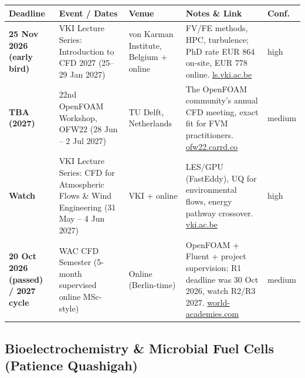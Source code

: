 \documentclass[11pt,a4paper]{article}
\begin{document}
\begin{longtable}{@{}p{3.2cm}p{3.0cm}p{2.5cm}p{5.2cm}p{1.6cm}@{}}
\toprule
\textbf{Deadline} & \textbf{Event / Dates} & \textbf{Venue} & \textbf{Notes \& Link} & \textbf{Conf.} \\
\midrule
\endhead
\textbf{25 Nov 2026 (early bird)} & VKI Lecture Series: Introduction to CFD 2027 (25--29 Jan 2027) & von Karman Institute, Belgium + online & FV/FE methods, HPC, turbulence; PhD rate EUR 864 on-site, EUR 778 online. \href{https://ls.vki.ac.be/store/lsdetails/229/introduction-to-computational-fluid-dynamics-2027}{ls.vki.ac.be} & high \\
\midrule
\textbf{TBA (2027)} & 22nd OpenFOAM Workshop, OFW22 (28 Jun -- 2 Jul 2027) & TU Delft, Netherlands & The OpenFOAM community's annual CFD meeting, exact fit for FVM practitioners. \href{https://ofw22.carrd.co/}{ofw22.carrd.co} & medium \\
\midrule
\textbf{Watch} & VKI Lecture Series: CFD for Atmospheric Flows \& Wind Engineering (31 May -- 4 Jun 2027) & VKI + online & LES/GPU (FastEddy), UQ for environmental flows, energy pathway crossover. \href{https://www.vki.ac.be/index.php/126-lecture-series--events/lecture-series}{vki.ac.be} & high \\
\midrule
\textbf{20 Oct 2026 (passed) / 2027 cycle} & WAC CFD Semester (5-month supervised online MSc-style) & Online (Berlin-time) & OpenFOAM + Fluent + project supervision; R1 deadline was 30 Oct 2026, watch R2/R3 2027. \href{https://www.world-academies.com/cfd-education-semester/}{world-academies.com} & medium \\
\bottomrule
\end{longtable}

\subsection{Bioelectrochemistry \& Microbial Fuel Cells (Patience Quashigah)}
\end{document}
